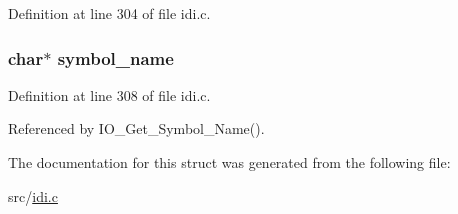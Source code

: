 Definition at line 304 of file idi.\+c.

\hypertarget{structreg__definition_a7e9d3f82b1d2ab1009d4df11f1ba7db6}{
\subsubsection[{symbol\+\_\+name}]{\setlength{\rightskip}{0pt plus 5cm}char$\ast$ symbol\+\_\+name}}\label{structreg__definition_a7e9d3f82b1d2ab1009d4df11f1ba7db6}


Definition at line 308 of file idi.\+c.



Referenced by I\+O\+\_\+\+Get\+\_\+\+Symbol\+\_\+\+Name().



The documentation for this struct was generated from the following file\+:\begin{DoxyCompactItemize}
\item 
src/\hyperlink{idi_8c}{idi.\+c}\end{DoxyCompactItemize}
